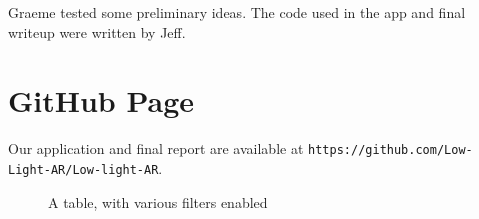 \documentclass[10pt,twocolumn,letterpaper]{article}
\begin{document}
Graeme tested some preliminary ideas. The code used in the app and final writeup were written by Jeff.

\section{GitHub Page}

Our application and final report are available at {\tt\small https://github.com/Low-Light-AR/Low-light-AR}.

{\small


}

\newpage

\begin{figure}[h]
\caption{A table, with various filters enabled}
  \centering
  \quad
  \quad

\end{figure}
\end{document}
